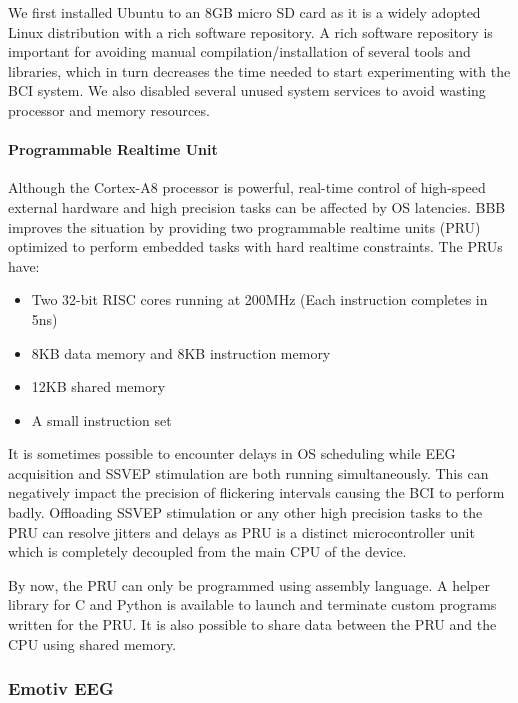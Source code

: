 \documentclass[12pt]{article}
\newcommand\mysubsubsection[1]{\subsubsection{#1}}
\newcommand\mysubsubsubsection[1]{\paragraph{#1}\hspace{0pt}}
\numberwithin{equation}{section}
\numberwithin{figure}{section}
\numberwithin{table}{section}
\begin{document}
\par{
    We first installed Ubuntu to an 8GB micro SD card as it is a widely adopted Linux distribution with a rich software repository.
    A rich software repository is important for avoiding manual compilation/installation of several tools and libraries,
    which in turn decreases the time needed to start experimenting with the BCI system. We also disabled
    several unused system services to avoid wasting processor and memory resources.
}

\mysubsubsubsection{Programmable Realtime Unit}
\par{
    Although the Cortex-A8 processor is powerful, real-time control of high-speed external hardware
    and high precision tasks can be affected by OS latencies. BBB improves the
    situation by providing two programmable realtime units (PRU) optimized to perform embedded tasks
    with hard realtime constraints. The PRUs have:
    \begin{itemize}
        \item Two 32-bit RISC cores running at 200MHz (Each instruction completes in 5ns)
        \item 8KB data memory and 8KB instruction memory
        \item 12KB shared memory
        \item A small instruction set
    \end{itemize}
    It is sometimes possible to encounter delays in OS scheduling while EEG
    acquisition and SSVEP stimulation are both running simultaneously. This can negatively
    impact the precision of flickering intervals causing the BCI to perform badly.
    Offloading SSVEP stimulation or any other high precision tasks to the
    PRU can resolve jitters and delays as PRU is a distinct
    microcontroller unit which is completely decoupled from the main CPU of the device.
}
\par{
    By now, the PRU can only be programmed using assembly language. A helper library
    for C and Python is available to launch and terminate custom programs written for the PRU.
    It is also possible to share data between the PRU and the CPU using shared memory.
}

\mysubsubsection{Emotiv EEG}
\end{document}
